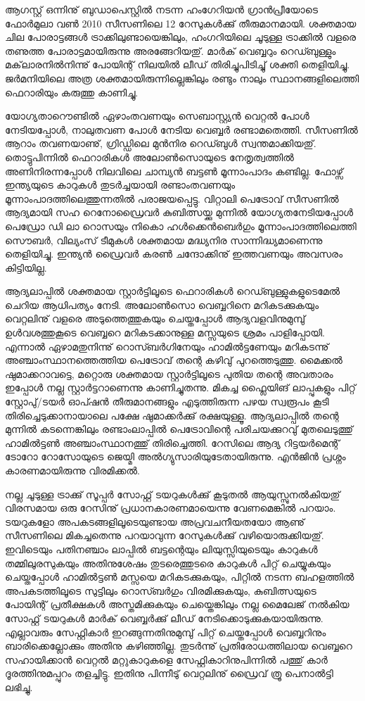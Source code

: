 ﻿
\vskip 2pt

ആഗസ്റ്റ് ഒന്നിനു് ബുഡാപെസ്റ്റില്‍ നടന്ന ഹംഗേറിയന്‍ ഗ്രാന്‍പ്രീയോടെ ഫോര്‍മുലാ വണ്‍ 2010 സീസണിലെ 12 റേസുകള്‍ക്കു് തീരുമാനമായി. ശക്തമായ ചില പോരാട്ടങ്ങള്‍ ട്രാക്കിലുണ്ടായെങ്കിലും, ഹംഗറിയിലെ ചൂടുള്ള ട്രാക്കില്‍ വളരെ തണുത്ത പോരാട്ടമായിരുന്നു അരങ്ങേറിയതു്. മാര്‍ക് വെബ്ബറും റെഡ്ബുള്ളും മക്‌ലാരനില്‍നിന്നു് പോയിന്റ് നിലയില്‍ ലീഡ് തിരിച്ചുപിടിച്ചു് ശക്തി തെളിയിച്ചു. ജര്‍മനിയിലെ അത്ര ശക്തമായിരുന്നില്ലെങ്കിലും രണ്ടും നാലും സ്ഥാനങ്ങളിലെത്തി ഫെറാരിയും കരുത്തു കാണിച്ചു.

യോഗ്യതാറൌണ്ടില്‍ ഏഴാംതവണയും സെബാസ്റ്റ്യന്‍ വെറ്റല്‍ പോള്‍ നേടിയപ്പോള്‍, നാലുതവണ പോള്‍ നേടിയ 
വെബ്ബര്‍ രണ്ടാമതെത്തി. സീസണില്‍ ആറാം തവണയാണു്, ഗ്രിഡ്ഡിലെ മുന്‍നിര റെഡ്ബുള്‍ സ്വന്തമാക്കിയതു്. 
തൊട്ടുപിന്നില്‍ ഫെറാരികള്‍ അലോണ്‍സൊയുടെ നേതൃത്വത്തില്‍ അണിനിരന്നപ്പോള്‍ നിലവിലെ ചാമ്പ്യന്‍ ബട്ടണ്‍ 
മൂന്നാംപാദം കണ്ടില്ല. ഫോഴ്സ് ഇന്ത്യയുടെ കാറുകള്‍ തുടര്‍ച്ചയായി രണ്ടാംതവണയും മൂന്നാംപാദത്തിലെത്തുന്നതില്‍ 
പരാജയപ്പെട്ടു. വിറ്റാലി പെട്രോവ് സീസണില്‍ ആദ്യമായി സഹ റെനോഡ്രൈവര്‍ കുബിത്സയ്ക്കു മുന്നില്‍ 
യോഗ്യതനേടിയപ്പോള്‍ പെഡ്രോ ഡി ലാ റൊസയും നികൊ ഹള്‍ക്കെന്‍ബെര്‍ഗും മൂന്നാംപാദത്തിലെത്തി സൌബര്‍, 
വില്യംസ് ടീമുകള്‍ ശക്തമായ മദ്ധ്യനിര സാന്നിദ്ധ്യമാണെന്നു തെളിയിച്ചു. ഇന്ത്യന്‍ ഡ്രൈവര്‍ കരണ്‍ ചന്ദോക്കിനു് 
ഇത്തവണയും അവസരം കിട്ടിയില്ല.

ആദ്യലാപ്പില്‍ ശക്തമായ സ്റ്റാര്‍ട്ടിലൂടെ ഫെറാരികള്‍ റെഡ്ബുള്ളുകളുടെമേല്‍ ചെറിയ ആധിപത്യം നേടി. അലോണ്‍സൊ 
വെബ്ബറിനെ മറികടക്കുകയും വെറ്റലിനു് വളരെ അടുത്തെത്തുകയും ചെയ്തപ്പോള്‍ ആദ്യവളവിനുമുമ്പു് ഉള്‍വശത്തുകൂടെ 
വെബ്ബറെ മറികടക്കാനുള്ള മസ്സയുടെ ശ്രമം പാളിപ്പോയി. എന്നാല്‍ ഏഴാമതുനിന്നു് റൊസ്ബര്‍ഗിനേയും ഹാമില്‍ട്ടണേയും
മറികടന്നു് അഞ്ചാംസ്ഥാനത്തെത്തിയ പെട്രോവ് തന്റെ കഴിവു് പുറത്തെടുത്തു. മൈക്കല്‍ ഷുമാക്കറാവട്ടെ, മറ്റൊരു 
ശക്തമായ സ്റ്റാര്‍ട്ടിലൂടെ പുതിയ തന്റെ അവതാരം ഇപ്പോള്‍ നല്ല സ്റ്റാര്‍ട്ടറാണെന്നു കാണിച്ചുതന്നു. മികച്ച ഫ്ലൈയിങ് 
ലാപ്പുകളും പിറ്റ് സ്റ്റോപു്/ടയര്‍ ഓപ്ഷന്‍ തീരുമാനങ്ങളും എടുത്തിരുന്ന പഴയ സ്വരൂപം കൂടി തിരിച്ചെടുക്കാനായാലെ പക്ഷേ 
ഷുമാക്കര്‍ക്കു് രക്ഷയുള്ളൂ. ആദ്യലാപ്പില്‍ തന്റെ മുന്നില്‍ കടന്നെങ്കിലും രണ്ടാംലാപ്പില്‍ പെട്രോവിന്റെ പരിചയക്കുറവു് 
മുതലെടുത്തു് ഹാമില്‍ട്ടണ്‍ അഞ്ചാംസ്ഥാനത്തു് തിരിച്ചെത്തി. റേസിലെ ആദ്യ റിട്ടയര്‍മെന്റ് ടോറോ റോസോയുടെ 
ജെയ്മി അല്‍ഗ്യുസാരിയുടേതായിരുന്നു. എന്‍ജിന്‍ പ്രശ്നം കാരണമായിരുന്നു വിരമിക്കല്‍.

നല്ല ചൂടുള്ള ട്രാക്കു് സൂപ്പര്‍ സോഫ്റ്റ് ടയറുകള്‍ക്കു് കൂടുതല്‍ ആയുസ്സുനല്‍കിയതു് വിരസമായ ഒരു റേസിനു് 
പ്രധാനകാരണമായെന്നു വേണമെങ്കില്‍ പറയാം. ടയറുകളോ അപകടങ്ങളിലൂടെയുണ്ടായ അപ്രവചനീയതയോ ആണു് 
സീസണിലെ മികച്ചതെന്നു പറയാവുന്ന റേസുകള്‍ക്കു് വഴിയൊരുക്കിയതു്. ഇവിടെയും പതിനഞ്ചാം ലാപ്പില്‍ ബട്ടന്റെയും 
ലിയുസ്സിയുടെയും കാറുകള്‍ തമ്മിലുരസുകയും അതിനുശേഷം തുടരെത്തുടരെ കാറുകള്‍ പിറ്റ് ചെയ്യുകയും ചെയ്തപ്പോള്‍ 
ഹാമില്‍ട്ടണ്‍ മസ്സയെ മറികടക്കുകയും, പിറ്റില്‍ നടന്ന ബഹളത്തില്‍ അപകടത്തിലൂടെ സുട്ടിലും റൊസ്ബര്‍ഗും 
വിരമിക്കുകയും, കുബിത്സയുടെ പോയിന്റ് പ്രതീക്ഷകള്‍ അസ്തമിക്കുകയും ചെയ്തെങ്കിലും നല്ല മൈലേജ് നല്‍കിയ സോഫ്റ്റ് 
ടയറുകള്‍ മാര്‍ക് വെബ്ബര്‍ക്കു് ലീഡ് നേടിക്കൊടുക്കുകയായിരുന്നു. എല്ലാവരും സേഫ്റ്റികാര്‍ ഇറങ്ങുന്നതിനുമുമ്പു് പിറ്റ് 
ചെയ്തപ്പോള്‍ വെബ്ബറിനും ബാരിക്കെല്ലോക്കും അതിനു കഴിഞ്ഞില്ല. തുടര്‍ന്നു് പ്രതിരോധത്തിലായ വെബ്ബറെ സഹായിക്കാന്‍ 
വെറ്റല്‍ മറ്റുകാറുകളെ സേഫ്റ്റികാറിനുപിന്നില്‍ പത്തു് കാര്‍ ദൂരത്തിനുമപ്പുറം തളച്ചിട്ടു. ഇതിനു പിന്നീടു് വെറ്റലിനു് ഡ്രൈവ് 
ത്രൂ പെനാല്‍ട്ടി ലഭിച്ചു.

